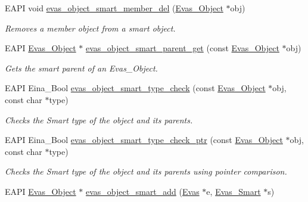 \begin{DoxyCompactItemize}
EAPI void \hyperlink{group__Evas__Smart__Object__Group_gaffa3573bd0f16f3eb21c3da8122194f7}{evas\_\-object\_\-smart\_\-member\_\-del} (\hyperlink{group__Evas__Object__Group_ga9e19e6dd1f517a0ba437c0114d3e7c97}{Evas\_\-Object} $\ast$obj)
\begin{DoxyCompactList}\small\item\em Removes a member object from a smart object. \item\end{DoxyCompactList}\item 
EAPI \hyperlink{group__Evas__Object__Group_ga9e19e6dd1f517a0ba437c0114d3e7c97}{Evas\_\-Object} $\ast$ \hyperlink{group__Evas__Smart__Object__Group_gaee8228f86a2a896112b3dbfe09d83511}{evas\_\-object\_\-smart\_\-parent\_\-get} (const \hyperlink{group__Evas__Object__Group_ga9e19e6dd1f517a0ba437c0114d3e7c97}{Evas\_\-Object} $\ast$obj)
\begin{DoxyCompactList}\small\item\em Gets the smart parent of an Evas\_\-Object. \item\end{DoxyCompactList}\item 
EAPI Eina\_\-Bool \hyperlink{group__Evas__Smart__Object__Group_ga21c7f06371bf49bebaba0df0b8c7cbef}{evas\_\-object\_\-smart\_\-type\_\-check} (const \hyperlink{group__Evas__Object__Group_ga9e19e6dd1f517a0ba437c0114d3e7c97}{Evas\_\-Object} $\ast$obj, const char $\ast$type)
\begin{DoxyCompactList}\small\item\em Checks the Smart type of the object and its parents. \item\end{DoxyCompactList}\item 
EAPI Eina\_\-Bool \hyperlink{group__Evas__Smart__Object__Group_ga2e93ee5ffcc0beec181cc640961ee3e6}{evas\_\-object\_\-smart\_\-type\_\-check\_\-ptr} (const \hyperlink{group__Evas__Object__Group_ga9e19e6dd1f517a0ba437c0114d3e7c97}{Evas\_\-Object} $\ast$obj, const char $\ast$type)
\begin{DoxyCompactList}\small\item\em Checks the Smart type of the object and its parents using pointer comparison. \item\end{DoxyCompactList}\item 
EAPI \hyperlink{group__Evas__Object__Group_ga9e19e6dd1f517a0ba437c0114d3e7c97}{Evas\_\-Object} $\ast$ \hyperlink{group__Evas__Smart__Object__Group_gaa61f845ee24ddb252a6fcb76d5f3c148}{evas\_\-object\_\-smart\_\-add} (\hyperlink{group__Evas__Canvas_ga5ff87cc4ce6bc43e3b640a6d37f73043}{Evas} $\ast$e, \hyperlink{Evas_8h_a7cdfd1afece1cad64c413eb9a778ddbb}{Evas\_\-Smart} $\ast$s)

\end{DoxyCompactItemize}
